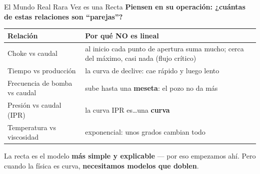 \documentclass[aspectratio=169, 11pt]{beamer}
\begin{document}
\begin{frame}[shrink=8]{El Mundo Real Rara Vez es una Recta}
  \vspace{-4pt}
  {\small\color{arcaDark}\bfseries
    Piensen en su operación: ¿cuántas de estas relaciones son ``parejas''?}

  \vspace{6pt}
  \centering
  {\footnotesize
  \renewcommand{\arraystretch}{1.5}
  \begin{tabular}{@{}p{4.6cm} p{6.8cm}@{}}
    \toprule
    {\bfseries\color{arcaDark} Relación} & {\bfseries\color{arcaRed} Por qué NO es lineal} \\
    \midrule
    \rowcolor{arcaGray}
    Choke vs caudal & al inicio cada punto de apertura suma mucho; cerca del máximo, casi nada (flujo crítico) \\
    Tiempo vs producción & la curva de declive: cae rápido y luego lento \\
    \rowcolor{arcaGray}
    Frecuencia de bomba vs caudal & sube hasta una \textbf{meseta}: el pozo no da más \\
    Presión vs caudal (IPR) & la curva IPR es\ldots una \textbf{curva} \\
    \rowcolor{arcaGray}
    Temperatura vs viscosidad & exponencial: unos grados cambian todo \\
    \bottomrule
  \end{tabular}
  }

  \vspace{8pt}
  {\footnotesize\color{textMuted}
    \faLightbulb[regular]\hspace{4pt}%
    La recta es el modelo \textbf{más simple y explicable} --- por eso empezamos ahí.
    Pero cuando la física es curva, \textbf{necesitamos modelos que doblen}.}
\end{frame}
\end{document}

